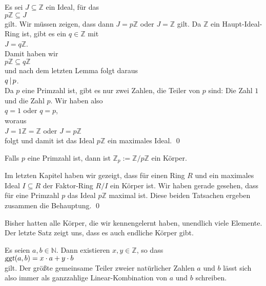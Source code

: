 \proof
Es sei $J \subseteq \mathbb{Z}$ ein Ideal, für das
\\[0.2cm]
\hspace*{1.3cm}
$p\mathbb{Z} \subseteq J$ 
\\[0.2cm]
gilt.  Wir müssen zeigen, dass dann $J = p\mathbb{Z}$ oder $J = \mathbb{Z}$ gilt.  Da $\mathbb{Z}$ ein
Haupt-Ideal-Ring ist, gibt es ein $q \in \mathbb{Z}$ mit
\\[0.2cm]
\hspace*{1.3cm}
$J = q\mathbb{Z}$.
\\[0.2cm]
Damit haben wir 
\\[0.2cm]
\hspace*{1.3cm}
$p\mathbb{Z} \subseteq q\mathbb{Z}$
\\[0.2cm]
und nach dem letzten Lemma folgt daraus
\\[0.2cm]
\hspace*{1.3cm}
$q \,|\, p$.
\\[0.2cm]
Da $p$ eine Primzahl ist, gibt es nur zwei Zahlen, die Teiler von $p$ sind: Die Zahl $1$ und die Zahl $p$.
Wir haben also
\\[0.2cm]
\hspace*{1.3cm}
$q = 1$ \quad oder \quad $q = p$,
\\[0.2cm]
woraus
\\[0.2cm]
\hspace*{1.3cm}
$J = 1\mathbb{Z} = \mathbb{Z}$ \quad oder \quad $J = p\mathbb{Z}$
\\[0.2cm]
folgt und damit ist das Ideal $p\mathbb{Z}$ ein maximales Ideal.  \qed

\begin{Korollar}
Falls $p$ eine Primzahl ist, dann ist $\mathbb{Z}_p := \mathbb{Z}/p\mathbb{Z}$ ein Körper.
\end{Korollar}

\proof
Im letzten Kapitel haben wir gezeigt, dass für einen Ring $R$ und ein maximales Ideal
$I \subseteq R$ der Faktor-Ring $R/I$ ein Körper ist.  Wir haben gerade gesehen, dass für eine Primzahl
$p$ das Ideal $p\mathbb{Z}$ maximal ist.  Diese beiden Tatsachen ergeben zusammen die Behauptung. \qed

\remark
Bisher hatten alle Körper, die wir kennengelernt haben, unendlich viele Elemente.
Der letzte Satz zeigt uns, dass es auch endliche Körper gibt.


\begin{Satz}
\label{satz:bezout}
  Es seien $a,b \in \mathbb{N}$.  Dann existieren $x,y \in \mathbb{Z}$, so dass
  \\[0.2cm]
  \hspace*{1.3cm}
  $\textsl{ggt}(a,b) = x \cdot a + y \cdot b$
  \\[0.2cm]
  gilt.  Der größte gemeinsame Teiler zweier natürlicher Zahlen $a$ und $b$ 
  lässt sich also immer als ganzzahlige Linear-Kombination von $a$ und $b$ schreiben.
\end{Satz}

